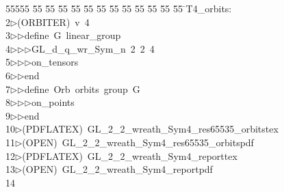 %
%
\begin{tabbing}
55555 \= 55 \= 55 \= 55 \= 55 \= 55 \= 55 \= 55 \= 55 \= 55 \= 55 \= 55 \= 55 \= \>T4\_orbits:\\[0pt]
2\>$\triangleright$\>(ORBITER)\ v\ 4\ \\[0pt]
3\>$\triangleright$\>$\triangleright$\>define\ G\ linear\_group\ \\[0pt]
4\>$\triangleright$\>$\triangleright$\>$\triangleright$\>GL\_d\_q\_wr\_Sym\_n\ 2\ 2\ 4\ \\[0pt]
5\>$\triangleright$\>$\triangleright$\>$\triangleright$\>on\_tensors\ \\[0pt]
6\>$\triangleright$\>$\triangleright$\>end\ \\[0pt]
7\>$\triangleright$\>$\triangleright$\>define\ Orb\ orbits\ group\ G\ \\[0pt]
8\>$\triangleright$\>$\triangleright$\>$\triangleright$\>on\_points\ \\[0pt]
9\>$\triangleright$\>$\triangleright$\>end\\[0pt]
10\>$\triangleright$\>(PDFLATEX)\ GL\_2\_2\_wreath\_Sym4\_res65535\_orbitstex\\[0pt]
11\>$\triangleright$\>(OPEN)\ GL\_2\_2\_wreath\_Sym4\_res65535\_orbitspdf\\[0pt]
12\>$\triangleright$\>(PDFLATEX)\ GL\_2\_2\_wreath\_Sym4\_reporttex\\[0pt]
13\>$\triangleright$\>(OPEN)\ GL\_2\_2\_wreath\_Sym4\_reportpdf\\[0pt]
14\>\end{tabbing}
